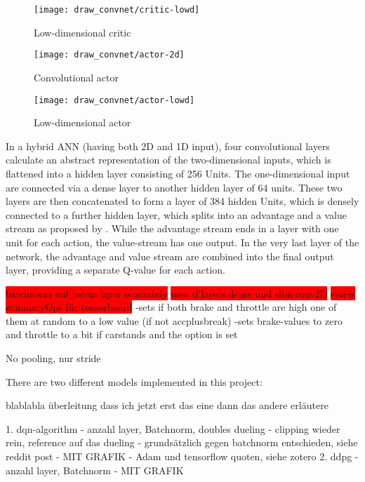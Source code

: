 \begin{figure}[h]
	\centering 
	\texttt{[image: draw\_convnet/critic-lowd]}
	\caption{Low-dimensional critic}
	\label{fig:lowcrit}
\end{figure}

\begin{figure}[h]
	\centering 
	\texttt{[image: draw\_convnet/actor-2d]}
	\caption{Convolutional actor}
	\label{fig:2dact}
\end{figure}

\begin{figure}[h]
	\centering 
	\texttt{[image: draw\_convnet/actor-lowd]}
	\caption{Low-dimensional actor}
	\label{fig:lowdact}
\end{figure}

In a hybrid ANN (having both 2D and 1D input), four convolutional layers calculate an abstract representation of the two-dimensional inputs, which is flattened into a hidden layer consisting of 256 Units. The one-dimensional input are connected via a dense layer to another hidden layer of 64 units. These two layers are then concatenated to form a layer of 384 hidden Units, which is densely connected to a further hidden layer, which splits into an advantage and a value stream as proposed by \cite{wang_dueling_2015}. While the advantage stream ends in a layer with one unit for each action, the value-stream has one output. In the very last layer of the network, the advantage and value stream are combined into the final output layer, providing a separate Q-value for each action.

\colorbox{red}{batchnorm auf jedem layer separately}
\colorbox{red}{uses tf.layers.dense und slim.conv2D}
\colorbox{red}{stores summaryOps für tensorboard}
-sets if both brake and throttle are high one of them at random to a low value (if not accplusbreak)
-sets brake-values to zero and throttle to a bit if carstands and the option is set

No pooling, nur stride

There are two different models implemented in this project: 


blablabla überleitung dass ich jetzt erst das eine dann das andere erläutere

1. dqn-algorithm
- anzahl layer, Batchnorm, doubles dueling
- clipping wieder rein, reference auf das dueling
- grundsätzlich gegen batchnorm entschieden, siehe reddit post
- MIT GRAFIK
- Adam und tensorflow quoten, siehe zotero
2. ddpg
- anzahl layer, Batchnorm
- MIT GRAFIK

